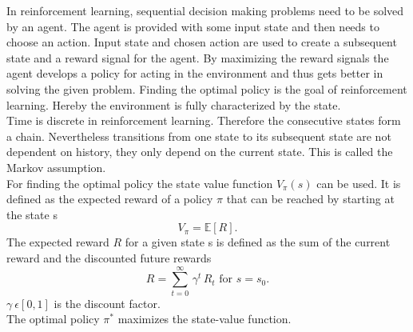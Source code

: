 \documentclass[12pt]{article}
\begin{document}
In reinforcement learning, sequential decision making problems need to be solved by an agent. The agent is provided with some input state and then needs to choose an action. Input state and chosen action are used to create a subsequent state and a reward signal for the agent. By maximizing the reward signals the agent develops a policy for acting in the environment and thus gets better in solving the given problem. Finding the optimal policy is the goal of reinforcement learning.
Hereby the environment is fully characterized by the state. \\
Time is discrete in reinforcement learning. Therefore the consecutive states form a chain.
Nevertheless transitions from one state to its subsequent state are not dependent on history, they only depend on the current state. This is called the Markov assumption. \\
For finding the optimal policy the state value function $V_\pi(s)$ can be used. It is defined as the expected reward of a policy $\pi$ that can be reached by starting at the state s
\begin{equation}
V_\pi=\mathbb{E}\left[R\right].
\end{equation}
The expected reward $R$ for a given state s is defined as the sum of the current reward and the discounted future rewards
\begin{equation}
R=\sum^\infty_{t=0}\,\gamma^t\,R_t \textrm{ for } s=s_0.
\end{equation}
$\gamma\:\epsilon\left[0,1\right]$ is the discount factor.\\
The optimal policy $\pi^*$ maximizes the state-value function.
\end{document}
